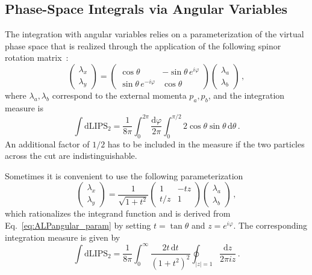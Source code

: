 \subsection{Phase-Space Integrals via Angular Variables}
\label{sec:ALPphasespace_angular}

The integration with angular variables relies on a parameterization of the virtual phase space
that is realized through the application of the following spinor rotation
matrix~\cite{Zwiebel:2011bx}:
\begin{equation}\label{eq:ALPangular_param}
    \begin{pmatrix}
 \lambda_x \\
 \lambda_y
    \end{pmatrix}
     =
    \begin{pmatrix}
 \cos\theta & -\sin\theta\, e^{i\varphi} \\
 \sin\theta\, e^{-i\varphi} & \cos\theta
\end{pmatrix}
\begin{pmatrix}
 \lambda_{a} \\
 \lambda_{b}
    \end{pmatrix}\,,
\end{equation}
where $\lambda_{a},\lambda_{b}$ correspond to the external momenta $p_a,p_b$, and the
integration measure is
\begin{equation}
    \int \text{dLIPS}_2= \frac{1}{8 \pi}\int_0^{2 \pi} \frac{\text{d}\varphi}{2\pi}\int_0^{\pi/2} 2 \cos\theta \sin\theta \, \text{d}\theta  \, .
    \label{eq:ALPangular_measure}
\end{equation}
An additional factor of $1/2$ has to be included in the measure if the two particles across the
cut are indistinguishable.

Sometimes it is convenient to use the following parameterization
\begin{equation}
    \begin{pmatrix}
        \lambda_x \\ \lambda_y
    \end{pmatrix}
    =
    \frac{1}{\sqrt{1+t^2}}
    \begin{pmatrix}
        1 & -tz \\
        t/z & 1
    \end{pmatrix}
    \begin{pmatrix}
        \lambda_a \\ \lambda_b
    \end{pmatrix}\,,
    \label{eq:ALPhybrid_param}
\end{equation}
which rationalizes the integrand function and is derived from Eq.~\eqref{eq:ALPangular_param}
by setting $t=\tan\theta$ and $z=e^{i\varphi}$.
The corresponding integration measure is given by
\begin{equation}
\label{eq:ALPhybrid}
    \int \text{dLIPS}_2 = \frac{1}{8\pi}\int_0^\infty \frac{2t \, \text{d}t}{(1+t^2)^2}\oint_{|z|=1}\frac{\text{d}z}{2\pi i z}\,.
\end{equation}

